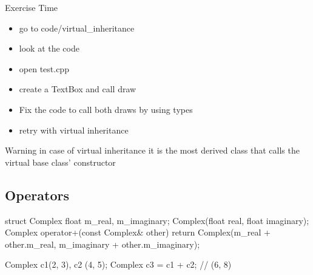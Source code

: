 \begin{frame}[fragile]
  \begin{alertblock}{Exercise Time}
    \begin{itemize}
    \item go to code/virtual\_inheritance
    \item look at the code
    \item open test.cpp
    \item create a TextBox and call draw
    \item Fix the code to call both draws by using types
    \item retry with virtual inheritance
    \end{itemize}
  \end{alertblock}
\end{frame}

\begin{frame}[fragile]
  \begin{alertblock}{Warning}
    in case of virtual inheritance it is the most derived class that calls the virtual base class' constructor
  \end{alertblock}
\end{frame}


\subsection{Operators}

\begin{frame}[fragile]
  \begin{cppcode}
    struct Complex {
      float m_real, m_imaginary;
      Complex(float real, float imaginary);
      Complex operator+(const Complex& other) {
        return Complex(m_real + other.m_real,
                       m_imaginary + other.m_imaginary);
      }
    }

    Complex c1(2, 3), c2 (4, 5);
    Complex c3 = c1 + c2; // (6, 8)
  \end{cppcode}
\end{frame}

